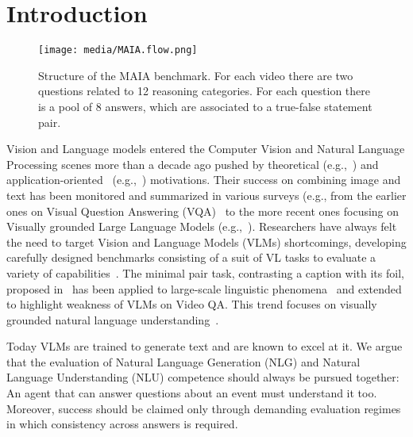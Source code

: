 \section{Introduction}

\begin{figure}[t!]
    \centering
    \texttt{[image: media/MAIA.flow.png]}
    \caption{Structure of the MAIA benchmark. For each video there are two questions related to 12 reasoning categories. For each question there is a pool of 8 answers, which are associated to a true-false statement pair.}
    \label{fig:maia_structure}
\end{figure}

Vision and Language models entered the Computer Vision and Natural Language Processing scenes more than a decade ago pushed by theoretical (e.g.,~\citealp{baro:groun15}) and application-oriented~ (e.g.,~\citealp{bigham:vizwiz10}) motivations. Their success on combining image and text has been monitored and summarized in various surveys (e.g., from the earlier ones on Visual Question Answering (VQA)~\citet{bern:ling21} to the more recent ones focusing on Visually grounded Large Language Models (e.g.,~\citealp{caffagni-etal-2024-revolution,li:mmfm24}). Researchers have always felt the need to target Vision and Language  Models (VLMs) shortcomings, developing carefully designed benchmarks consisting of a suit of VL tasks to evaluate a variety of capabilities~\cite{kafle:chall19}.  The minimal pair task, contrasting a caption with its foil, proposed in~\citet{shekhar-etal-2017-foil} has been applied to large-scale linguistic phenomena~\cite{valse} and extended to highlight weakness of VLMs on Video QA. This trend focuses on visually grounded natural language understanding~\cite{vilma}. 

Today VLMs are trained to generate text and are known to excel at it. We argue that the evaluation of Natural Language Generation (NLG) and Natural Language Understanding (NLU) competence should always be pursued together: An agent that can answer questions about an event must understand it too. 
Moreover, success should be claimed only through demanding evaluation regimes in which consistency across answers is required.  

